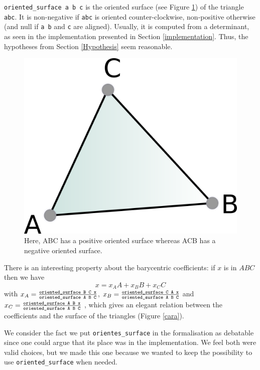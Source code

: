 \documentclass[a4paper,10pt]{article}
\begin{document}
{\tt oriented\_surface a b c} is the oriented surface (see Figure \ref{surface}) of the triangle {\tt abc}. It is non-negative if {\tt abc} is oriented counter-clockwise, non-positive otherwise (and null if {\tt a b} and {\tt c} are aligned).
Usually, it is computed from a determinant, as seen in the implementation presented in Section \ref{implementation}. Thus, the hypotheses from Section \ref{Hypothesis} seem reasonable.

\begin{figure}
  \centering
  \includegraphics{Surface}
  \caption{\label{surface} Here, ABC has a positive oriented surface whereas ACB has a negative oriented surface.}
\end{figure}

 There is an interesting property about the barycentric coefficients: if $x$ is in $ABC$ then we have
$$x = x_AA + x_BB + x_CC$$
with $x_A =\frac{ \text{\tt oriented\_surface B C x}}{\text{\tt oriented\_surface A B C}}$,
$x_B =\frac{ \text{\tt oriented\_surface C A x}}{\text{\tt oriented\_surface A B C}}$ and
$x_C =\frac{ \text{\tt oriented\_surface A B x}}{\text{\tt oriented\_surface A B C}}$
, which gives an elegant relation between the coefficients and the surface of the triangles (Figure \ref{cara}).

We consider the fact we put {\tt orientes\_surface} in the formalisation as debatable since one could argue that its place  was in the implementation. We feel both were valid choices, but we made this one because we wanted to keep the possibility to use {\tt oriented\_surface} when needed.
\end{document}
